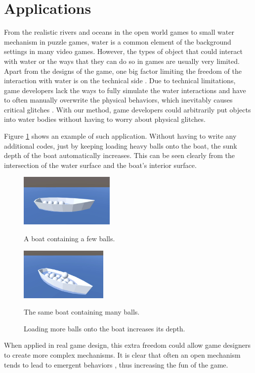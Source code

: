 \section{Applications}

From the realistic rivers and oceans in the open world games to small water mechanism in puzzle games,
water is a common element of the background settings in many video games.
However, the types of object that could interact with water or the ways that they can do so in games are usually very limited.
Apart from the designs of the game, one big factor limiting the freedom of the interaction with water is on the technical side \cite{kellomaki2012water}.
Due to technical limitations, game developers lack the ways to fully simulate the water interactions and have to often manually overwrite the physical behaviors, which inevitably causes critical glitches \cite{RedditAssassin}.
With our method, game developers could arbitrarily put objects into water bodies without having to worry about physical glitches.

Figure \ref{boat-sample} shows an example of such application.
Without having to write any additional codes, just by keeping loading heavy balls onto the boat, the sunk depth of the boat automatically increases.
This can be seen clearly from the intersection of the water surface and the boat's interior surface.

\begin{figure}[htb]
	\centering
	\begin{subcaptionblock}{0.46\textwidth}
		\centering
		\includegraphics[height=1in]{figures/light-boat.jpg}
		\caption{A boat containing a few balls.}
	\end{subcaptionblock}
	\begin{subcaptionblock}{0.46\textwidth}
		\centering
		\includegraphics[height=1in]{figures/heavy-boat.jpg}
		\caption{The same boat containing many balls.}
	\end{subcaptionblock}
	\caption{Loading more balls onto the boat increases its depth.}
	\label{boat-sample}
\end{figure}

When applied in real game design, this extra freedom could allow game designers to create more complex mechanisms.
It is clear that often an open mechanism tends to lead to emergent behaviors \cite{sweetser2006emergent}, thus increasing the fun of the game.